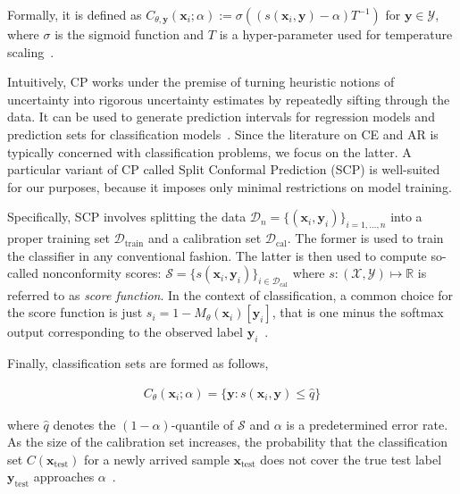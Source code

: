 \documentclass{article}
\begin{document}
Formally, it is defined as $C_{\theta,\mathbf{y}}(\mathbf{x}_i;\alpha):=\sigma\left((s(\mathbf{x}_i,\mathbf{y})-\alpha) T^{-1}\right)$ for $\mathbf{y}\in\mathcal{Y}$, where $\sigma$ is the sigmoid function and $T$ is a hyper-parameter used for temperature scaling~\citep{stutz2022learning}.

Intuitively, CP works under the premise of turning heuristic notions of uncertainty into rigorous uncertainty estimates by repeatedly sifting through the data. It can be used to generate prediction intervals for regression models and prediction sets for classification models~\citep{altmeyer2022conformal}. Since the literature on CE and AR is typically concerned with classification problems, we focus on the latter. A particular variant of CP called Split Conformal Prediction (SCP) is well-suited for our purposes, because it imposes only minimal restrictions on model training. 

Specifically, SCP involves splitting the data $\mathcal{D}_n=\{(\mathbf{x}_i,\mathbf{y}_i)\}_{i=1,...,n}$ into a proper training set $\mathcal{D}_{\text{train}}$ and a calibration set $\mathcal{D}_{\text{cal}}$. The former is used to train the classifier in any conventional fashion. The latter is then used to compute so-called nonconformity scores: $\mathcal{S}=\{s(\mathbf{x}_i,\mathbf{y}_i)\}_{i \in \mathcal{D}_{\text{cal}}}$ where $s: (\mathcal{X},\mathcal{Y}) \mapsto \mathbb{R}$ is referred to as \textit{score function}. In the context of classification, a common choice for the score function is just $s_i=1-M_{\theta}(\mathbf{x}_i)[\mathbf{y}_i]$, that is one minus the softmax output corresponding to the observed label $\mathbf{y}_i$~\citep{angelopoulos2021gentle}. 

Finally, classification sets are formed as follows,

\begin{equation}\label{eq:scp}
  \begin{aligned}
    C_{\theta}(\mathbf{x}_i;\alpha)=\{\mathbf{y}: s(\mathbf{x}_i,\mathbf{y}) \le \hat{q}\}
  \end{aligned}
\end{equation}

where $\hat{q}$ denotes the $(1-\alpha)$-quantile of $\mathcal{S}$ and $\alpha$ is a predetermined error rate. As the size of the calibration set increases, the probability that the classification set $C(\mathbf{x}_{\text{test}})$ for a newly arrived sample $\mathbf{x}_{\text{test}}$ does not cover the true test label $\mathbf{y}_{\text{test}}$ approaches $\alpha$~\citep{angelopoulos2021gentle}. 
\end{document}
